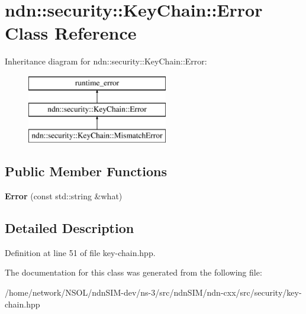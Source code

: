 \hypertarget{classndn_1_1security_1_1KeyChain_1_1Error}{}\section{ndn\+:\+:security\+:\+:Key\+Chain\+:\+:Error Class Reference}
\label{classndn_1_1security_1_1KeyChain_1_1Error}
Inheritance diagram for ndn\+:\+:security\+:\+:Key\+Chain\+:\+:Error\+:\begin{figure}[H]
\begin{center}
\leavevmode
\includegraphics[height=3.000000cm]{classndn_1_1security_1_1KeyChain_1_1Error}
\end{center}
\end{figure}
\subsection*{Public Member Functions}
\begin{DoxyCompactItemize}
\item 
{\bfseries Error} (const std\+::string \&what)\hypertarget{classndn_1_1security_1_1KeyChain_1_1Error_a0613564432c8f83b815945ad1993f869}{}\label{classndn_1_1security_1_1KeyChain_1_1Error_a0613564432c8f83b815945ad1993f869}

\end{DoxyCompactItemize}


\subsection{Detailed Description}


Definition at line 51 of file key-\/chain.\+hpp.



The documentation for this class was generated from the following file\+:\begin{DoxyCompactItemize}
\item 
/home/network/\+N\+S\+O\+L/ndn\+S\+I\+M-\/dev/ns-\/3/src/ndn\+S\+I\+M/ndn-\/cxx/src/security/key-\/chain.\+hpp\end{DoxyCompactItemize}
